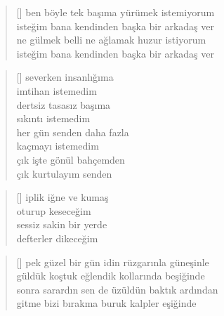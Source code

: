 \documentclass[10pt, openright, twoside]{memoir}
\theoremstyle{definition}
\begin{document}
\vspace*{\fill}
%
\newpage
{}
\vspace*{\fill}
\settowidth{\versewidth}{isteğim bana kendinden başka bir arkadaş ver}
\begin{verse}[\versewidth]
  ben böyle tek başıma yürümek istemiyorum \\
  isteğim bana kendinden başka bir arkadaş ver \\
  ne gülmek belli ne ağlamak huzur istiyorum \\
  isteğim bana kendinden başka bir arkadaş ver
\end{verse}
\vspace*{\fill}
%
\newpage
{}
\vspace*{\fill}
\settowidth{\versewidth}{her gün senden daha fazla}
\begin{verse}[\versewidth]
  severken insanlığıma \\
  imtihan istemedim \\
  dertsiz tasasız başıma \\
  sıkıntı istemedim \\
  her gün senden daha fazla \\
  kaçmayı istemedim \\
  çık işte gönül bahçemden \\
  çık kurtulayım senden
\end{verse}
\vspace*{\fill}
%
\newpage
{}
\vspace*{\fill}
\settowidth{\versewidth}{sessiz sakin bir yerde}
\begin{verse}[\versewidth]
  iplik iğne ve kumaş \\
  oturup keseceğim \\
  sessiz sakin bir yerde \\
  defterler dikeceğim
\end{verse}
\vspace*{\fill}
%
\newpage
{}
\vspace*{\fill}
\settowidth{\versewidth}{sonra sarardın sen de üzüldün baktık ardından}
\begin{verse}[\versewidth]
  pek güzel bir gün idin rüzgarınla güneşinle \\
  güldük koştuk eğlendik kollarında beşiğinde \\
  sonra sarardın sen de üzüldün baktık ardından \\
  gitme bizi bırakma buruk kalpler eşiğinde
\end{verse}
\end{document}
